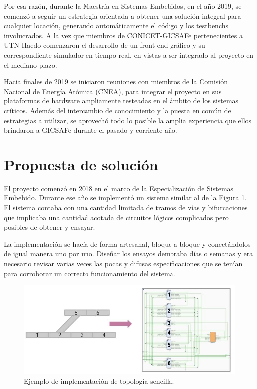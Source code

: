 		Por esa razón, durante la Maestría en Sistemas Embebidos, en el año 2019, se comenzó a seguir un estrategia orientada a obtener una solución integral para cualquier locación, generando automáticamente el código y los testbenchs involucrados. A la vez que miembros de CONICET-GICSAFe pertenecientes a UTN-Haedo comenzaron el desarrollo de un front-end gráfico y su correspondiente simulador en tiempo real, en vistas a ser integrado al proyecto en el mediano plazo.
	
		Hacia finales de 2019 se iniciaron reuniones con miembros de la Comisión Nacional de Energía Atómica (CNEA), para integrar el proyecto en sus plataformas de hardware ampliamente testeadas en el ámbito de los sistemas críticos. Además del intercambio de conocimiento y la puesta en común de estrategias a utilizar, se aprovechó todo lo posible la amplia experiencia que ellos brindaron a GICSAFe durante el pasado y corriente año.
		
	\section{Propuesta de solución}	
		
		El proyecto comenzó en 2018 en el marco de la Especialización de Sistemas Embebido. Durante ese año se implementó un sistema similar al de la Figura \ref{fig:CESE_1}. El sistema contaba con una cantidad limitada de tramos de vías y bifurcaciones que implicaba una cantidad acotada de circuitos lógicos complicados pero posibles de obtener y ensayar.
		
		La implementación se hacía de forma artesanal, bloque a bloque y conectándolos de igual manera uno por uno. Diseñar los ensayos demoraba días o semanas y era necesario revisar varias veces las pocas y difusas especificaciones que se tenían para corroborar un correcto funcionamiento del sistema.	
		
		\begin{figure}[htbp!]
			\centering
			\includegraphics[scale=.5]{./Figures/Grafo_VHDL}
			\caption{Ejemplo de implementación de topología sencilla.}
			\label{fig:CESE_1}
		\end{figure}	
		
